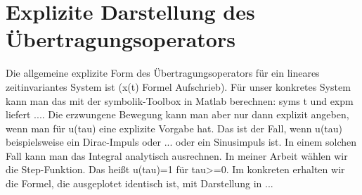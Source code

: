\section{Explizite Darstellung des Übertragungsoperators} %
Die allgemeine explizite Form des Übertragungsoperators für ein lineares zeitinvariantes System ist (x(t) Formel Aufschrieb).
Für unser konkretes System kann man das mit der symbolik-Toolbox in Matlab berechnen: syms t und expm liefert ....
Die erzwungene Bewegung kann man aber nur dann explizit angeben, wenn man für u(tau) eine explizite Vorgabe hat. Das ist der Fall, wenn u(tau) beispielsweise ein Dirac-Impuls oder ... 
oder ein Sinusimpuls ist. In einem solchen Fall kann man das Integral analytisch ausrechnen. In meiner Arbeit wählen wir die Step-Funktion. 
Das heißt u(tau)=1 für tau>=0. Im konkreten erhalten wir die Formel, die ausgeplotet identisch ist, mit Darstellung in ...